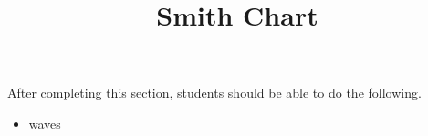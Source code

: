 \documentclass{ximera}
\title{Smith Chart}
\begin{document}
\begin{abstract}
\end{abstract}

\maketitle

\begin{sectionOutcomes}

After completing this section, students should be able to do the following.

\begin{itemize}
\item waves
\end{itemize}

\end{sectionOutcomes}
\end{document}
